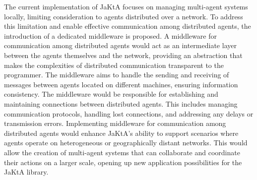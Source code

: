 The current implementation of JaKtA focuses on managing multi-agent systems locally, limiting consideration to agents distributed over a network. To address this limitation and enable effective communication among distributed agents, the introduction of a dedicated middleware is proposed.
A middleware for communication among distributed agents would act as an intermediate layer between the agents themselves and the network, providing an abstraction that makes the complexities of distributed communication transparent to the programmer. The middleware aims to handle the sending and receiving of messages between agents located on different machines, ensuring information consistency.
The middleware would be responsible for establishing and maintaining connections between distributed agents. This includes managing communication protocols, handling lost connections, and addressing any delays or transmission errors.
Implementing middleware for communication among distributed agents would enhance JaKtA's ability to support scenarios where agents operate on heterogeneous or geographically distant networks. This would allow the creation of multi-agent systems that can collaborate and coordinate their actions on a larger scale, opening up new application possibilities for the JaKtA library.
